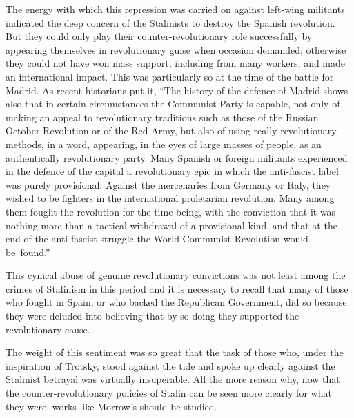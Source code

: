 The energy with which this repression was carried on against left-wing militants indicated the deep concern of the Stalinists to destroy the Spanish revolution. But they could only play their counter-revolutionary role successfully by appearing themselves in revolutionary guise when occasion demanded; otherwise they could not have won mass support, including from many workers, and made an international impact. This was particularly so at the time of the battle for Madrid. As recent historians put it, ``The history of the defence of Madrid shows also that in certain circumstances the Communist Party{\indexPCE} is capable, not only of making an appeal to revolutionary traditions such as those of the Russian October Revolution or of the Red Army, but also of using really revolutionary methods, in a word, appearing, in the eyes of large masses of people, as an authentically revolutionary party. Many Spanish or foreign militants experienced in the defence of the capital a revolutionary epic in which the anti-fascist label was purely provisional. Against the mercenaries from Germany or Italy, they wished to be fighters in the international proletarian revolution. Many among them fought the revolution for the time being, with the conviction that it was nothing more than a tactical withdrawal of a provisional kind, and that at the end of the anti-fascist struggle the World Communist Revolution would be~found.''

This cynical abuse of genuine revolutionary convictions was not least among the crimes of Stalinism in this period and it is necessary to recall that many of those who fought in Spain, or who backed the Republican Government, did so because they were deluded into believing that by so doing they supported the revolutionary cause.

The weight of this sentiment was so great that the task of those who, under the inspiration of Trotsky, stood against the tide and spoke up clearly against the Stalinist betrayal was virtually insuperable. All the more reason why, now that the counter-revolutionary policies of Stalin can be seen more clearly for what they were, works like Morrow’s should be studied.

